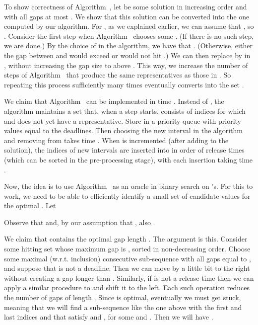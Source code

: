 \medskip

To show correctness of Algorithm~,
let  be some solution in increasing order and
with all gaps at most . We show that this solution can be converted into the one computed by our algorithm.
For , as we explained earlier, we can assume that , so  .
Consider the first step when Algorithm~ chooses some .  (If there is no such step, we are done.)
By the choice of  in the algorithm, we have that .  
(Otherwise, either the gap between  and  would exceed  or  would not hit .)
We can then replace  by  in , without increasing the gap
size to above . This way, we increase the number of steps of
Algorithm~ that produce the same representatives as those in .
So repeating this process sufficiently many times eventually converts  into the set .

\smallskip

We claim that Algorithm~ can be implemented in time . Instead of
, the algorithm maintains a set  that, when a step  starts, consists of indices  for which
 and  does not yet have a representative. 
Store  in a  priority queue with priority values equal to the deadlines.
Then choosing the new interval  in the algorithm and removing  from  takes time .
When  is incremented (after adding  to the solution), the indices of new intervals are inserted
into  in order of release times (which can be sorted in the pre-processing stage), with each insertion taking time .

\medskip

Now, the idea is to use Algorithm~ as an oracle in binary search on 's. 
For this to work, we need to be able to efficiently identify a small set of candidate values for the optimal . Let 

Observe that  and, by our assumption that , also .

We claim that  contains the optimal gap length . The argument is this. 
Consider some hitting set  whose maximum gap is , 
sorted in non-decreasing order. Choose some maximal (w.r.t. inclusion)
consecutive sub-sequence  
with all gaps equal to , and suppose that  is not a deadline. 
Then we can move  by a little bit to the right without creating a gap
longer than . Similarly, if  is not a release time then
we can apply a similar procedure to  and shift it to the left.
Each such operation reduces the number of gaps of length . Since  is optimal,
eventually we must get stuck, meaning that we will find a sub-sequence like the one above with the first
and last indices  and  that satisfy  and , for some  and .
Then we will have .


